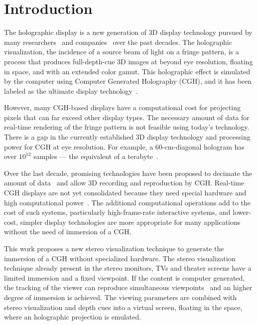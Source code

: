 \section{Introduction}
\label{sec.introduction}

The holographic display is a new generation of 3D display technology pursued by many researchers~\cite{Lucente1992, Watlington1995, Lucente2012} and companies~\cite{schwerdtner2013} over the past decades. The holographic visualization, the incidence of a source beam of light on a fringe pattern, is a process that produces full-depth-cue 3D images at beyond eye resolution, floating in space, and with an extended color gamut. This holographic effect is simulated by the computer using Computer Generated Holography (CGH), and it has been labeled as the ultimate display technology~\cite{Slinger2005}. 

However, many CGH-based displays have a computational cost for projecting pixels that can far exceed other display types. The necessary amount of data for real-time rendering of the fringe pattern is not feasible using today's technology. There is a gap in the currently established 3D display technology and processing power for CGH at eye resolution. For example, a 60-cm-diagonal hologram has over $10^{12}$ samples --– the equivalent of a terabyte~\cite{Lucente2012}.  

Over the last decade, promising technologies have been proposed to decimate the amount of data~\cite{Lucente1992, schwerdtner2013} and allow 3D recording and reproduction by CGH. Real-time CGH displays are not yet consolidated because they need special hardware and high computational power~\cite{Lucente1992, Watlington1995, Lucente2012}. The additional computational operations add to the cost of such systems, particularly high-frame-rate interactive systems, and lower-cost, simpler display technologies are more appropriate for many applications without the need of immersion of a CGH. 

This work proposes a new stereo visualization technique to generate the immersion of a CGH without specialized hardware. The stereo visualization technique already present in the stereo monitors, TVs and theater screens have a limited immersion and a fixed viewpoint. If the content is computer generated, the tracking of the viewer can reproduce simultaneous viewpoints~\cite{Frohlich2005, Harris2010} and an higher degree of immersion is achieved. The viewing parameters are combined with stereo visualization and depth cues into a virtual screen, floating in the space, where an holographic projection is emulated. 

